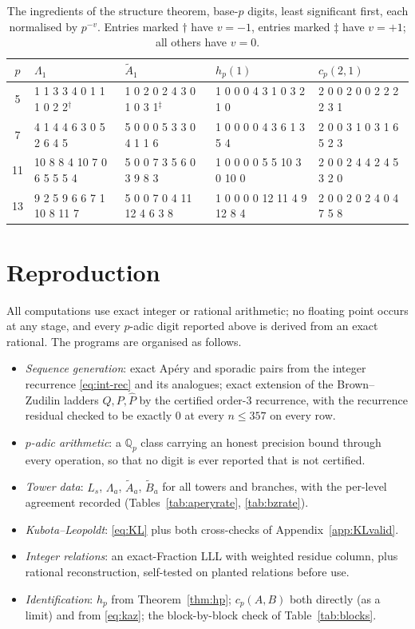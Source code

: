 \documentclass[11pt,reqno]{article}
\newcommand{\Qp}{\mathbb{Q}_p}
\newcommand{\Ph}{\widehat{P}}
\newcommand{\Atil}{\widetilde{A}}
\newcommand{\Btil}{\widetilde{B}}
\theoremstyle{plain}
\theoremstyle{definition}
\theoremstyle{remark}
\numberwithin{equation}{section}
\begin{document}
\begin{table}[h]
\centering\scriptsize
\setlength{\tabcolsep}{3pt}
\caption{The ingredients of the structure theorem, base-$p$ digits, least
significant first, each normalised by $p^{-v}$.  Entries marked $\dagger$ have
$v=-1$, entries marked $\ddagger$ have $v=+1$; all others have $v=0$.}
\label{tab:ingredients}
\begin{tabular}{@{}cllll@{}}
\toprule
$p$ & $\Lambda_1$ & $\Atil_1$ & $h_p(1)$ & $c_p(2,1)$\\
\midrule
5 & 1 1 3 3 4 0 1 1 1 0 2 2$^\dagger$ & 1 0 2 0 2 4 3 0 1 0 3 1$^\ddagger$ & 1 0 0 0 4 3 1 0 3 2 1 0 & 2 0 0 2 0 0 2 2 2 2 3 1\\
7 & 4 1 4 4 6 3 0 5 2 6 4 5 & 5 0 0 0 5 3 3 0 4 1 1 6 & 1 0 0 0 0 4 3 6 1 3 5 4 & 2 0 0 3 1 0 3 1 6 5 2 3\\
11 & 10 8 8 4 10 7 0 6 5 5 5 4 & 5 0 0 7 3 5 6 0 3 9 8 3 & 1 0 0 0 0 5 5 10 3 0 10 0 & 2 0 0 2 4 4 2 4 5 3 2 0\\
13 & 9 2 5 9 6 6 7 1 10 8 11 7 & 5 0 0 7 0 4 11 12 4 6 3 8 & 1 0 0 0 0 12 11 4 9 12 8 4 & 2 0 0 2 0 2 4 0 4 7 5 8\\
\bottomrule
\end{tabular}
\end{table}

\section{Reproduction}\label{app:repro}

All computations use exact integer or rational arithmetic; no floating point
occurs at any stage, and every $p$-adic digit reported above is derived from an
exact rational.  The programs are organised as follows.

\begin{itemize}[leftmargin=1.5em]
\item \emph{Sequence generation}: exact Ap\'ery and sporadic pairs from the
  integer recurrence \eqref{eq:int-rec} and its analogues; exact extension of
  the Brown--Zudilin ladders $Q,P,\Ph$ by the certified order-$3$ recurrence,
  with the recurrence residual checked to be exactly $0$ at every $n\le357$ on
  every row.
\item \emph{$p$-adic arithmetic}: a $\Qp$ class carrying an honest precision
  bound through every operation, so that no digit is ever reported that is not
  certified.
\item \emph{Tower data}: $L_s$, $\Lambda_a$, $\Atil_a$, $\Btil_a$ for all towers
  and branches, with the per-level agreement recorded (Tables~\ref{tab:aperyrate},
  \ref{tab:bzrate}).
\item \emph{Kubota--Leopoldt}: \eqref{eq:KL} plus both cross-checks of
  Appendix~\ref{app:KLvalid}.
\item \emph{Integer relations}: an exact-Fraction LLL with weighted residue
  column, plus rational reconstruction, self-tested on planted relations before
  use.
\item \emph{Identification}: $h_p$ from Theorem~\ref{thm:hp}; $c_p(A,B)$ both
  directly (as a limit) and from \eqref{eq:kaz}; the block-by-block check of
  Table~\ref{tab:blocks}.
\end{itemize}
\end{document}
